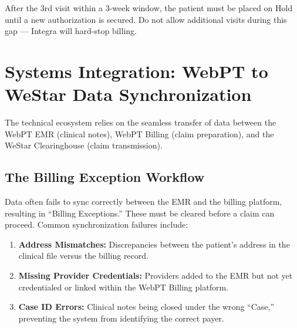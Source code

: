\documentclass[11pt,a4paper]{article}
\begin{document}
\begin{tcolorbox}[warnbox,title={Integra 3-Visit Hold Rule}]
After the 3rd visit within a 3-week window, the patient must be placed on Hold until a new authorization is secured. Do not allow additional visits during this gap --- Integra will hard-stop billing.
\end{tcolorbox}


\section{Systems Integration: WebPT to WeStar Data Synchronization}

The technical ecosystem relies on the seamless transfer of data between the WebPT EMR (clinical notes), WebPT Billing (claim preparation), and the WeStar Clearinghouse (claim transmission).

\subsection{The Billing Exception Workflow}

Data often fails to sync correctly between the EMR and the billing platform, resulting in ``Billing Exceptions.'' These must be cleared before a claim can proceed. Common synchronization failures include:

\begin{tcolorbox}[infobox,title={Common Billing Exceptions}]
\begin{enumerate}
  \item \textbf{Address Mismatches:} Discrepancies between the patient's address in the clinical file versus the billing record.
  \item \textbf{Missing Provider Credentials:} Providers added to the EMR but not yet credentialed or linked within the WebPT Billing platform.
  \item \textbf{Case ID Errors:} Clinical notes being closed under the wrong ``Case,'' preventing the system from identifying the correct payer.
\end{enumerate}
\end{tcolorbox}
\end{document}

